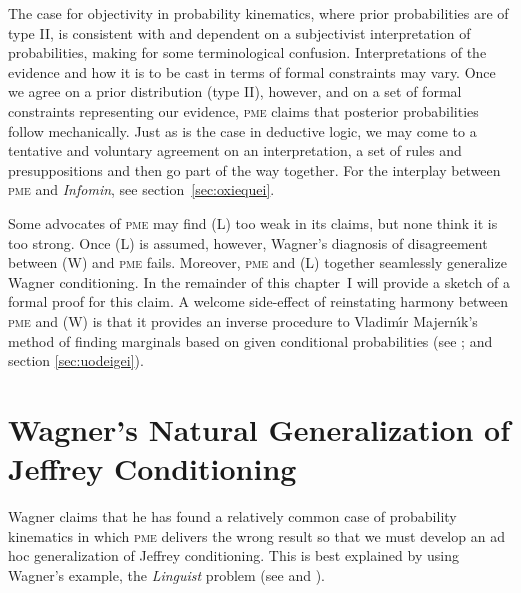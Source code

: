 \documentclass[phd,12pt,oneside]{ubcthesis}
\begin{document}
The case for objectivity in probability kinematics, where prior
probabilities are of type II, is consistent with and dependent on a
subjectivist interpretation of probabilities, making for some
terminological confusion. Interpretations of the evidence and how it
is to be cast in terms of formal constraints may vary. Once we agree
on a prior distribution (type II), however, and on a set of formal
constraints representing our evidence, \textsc{pme} claims that
posterior probabilities follow mechanically. Just as is the case in
deductive logic, we may come to a tentative and voluntary agreement on
an interpretation, a set of rules and presuppositions and then go part
of the way together. For the interplay between \textsc{pme} and
\emph{Infomin}, see section~\ref{sec:oxiequei}.

Some advocates of \textsc{pme} may find (L) too weak in its claims,
but none think it is too strong. Once (L) is assumed, however,
Wagner's diagnosis of disagreement between (W) and \textsc{pme} fails.
Moreover, \textsc{pme} and (L) together seamlessly generalize Wagner
conditioning. In the remainder of this chapter~I will provide a sketch
of a formal proof for this claim. A welcome side-effect of reinstating
harmony between \textsc{pme} and (W) is that it provides an inverse
procedure to Vladim{\'\i}r Majern{\'\i}k's method of finding marginals
based on given conditional probabilities (see ;
and section \ref{sec:uodeigei}).

\section{Wagner's Natural Generalization of Jeffrey Conditioning}
\label{sec:feeriesh}

Wagner claims that he has found a relatively common case of
probability kinematics in which \textsc{pme} delivers the wrong result
so that we must develop an ad hoc generalization of Jeffrey
conditioning. This is best explained by using Wagner's example, the
\emph{Linguist} problem (see  and
).
\end{document}
